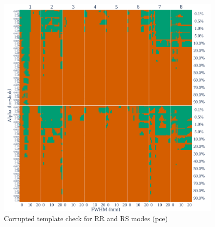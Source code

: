 \documentclass[lettersize,journal]{IEEEtran}
\begin{document}
\begin{figure}
    \centering
    \includegraphics[width=\linewidth]{figures/template/template_pce.pdf}
    \caption{Corrupted template check for RR and RS modes (pce)}
\end{figure}






\end{document}
